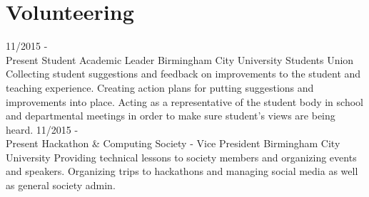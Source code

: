 \documentclass[]{friggeri-cv}
\begin{document}
\section{Volunteering}
    \begin{entrylist}
        \entry
    {11/2015 - \\ Present}
    {Student Academic Leader }
    {Birmingham City University Students Union}
    {Collecting student suggestions and feedback on improvements to the student and teaching experience. Creating action plans for putting suggestions and improvements into place. Acting as a representative of the student body in school and departmental meetings in order to make sure student's views are being heard. }
        \entry
    {11/2015 - \\ Present}
    {Hackathon \& Computing Society - Vice President}
    {Birmingham City University}
    {Providing technical lessons to society members and organizing events and speakers.  Organizing trips to hackathons and managing social media as well as general society admin. }
    \end{entrylist}


% 
\end{document}
